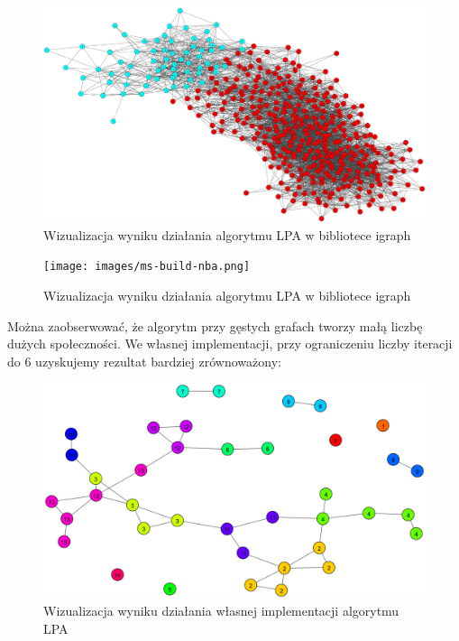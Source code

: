 \documentclass{article}
\begin{document}
\begin{figure}[H]
\centering
\includegraphics[width=\textwidth]{images/ms-build-lpa-2.png}
\caption{Wizualizacja wyniku działania algorytmu LPA w bibliotece igraph}
\end{figure}

\begin{figure}[H]
\centering
\texttt{[image: images/ms-build-nba.png]}
\caption{Wizualizacja wyniku działania algorytmu LPA w bibliotece igraph}
\end{figure}

Można zaobserwować, że algorytm przy gęstych grafach tworzy małą liczbę dużych społeczności. We własnej implementacji, przy ograniczeniu liczby iteracji do 6 uzyskujemy rezultat bardziej zrównoważony:

\begin{figure}[H]
\centering
\includegraphics[width=\textwidth]{images/ms-lpa-0.png}
\caption{Wizualizacja wyniku działania własnej implementacji algorytmu LPA} 
\end{figure}
\end{document}
